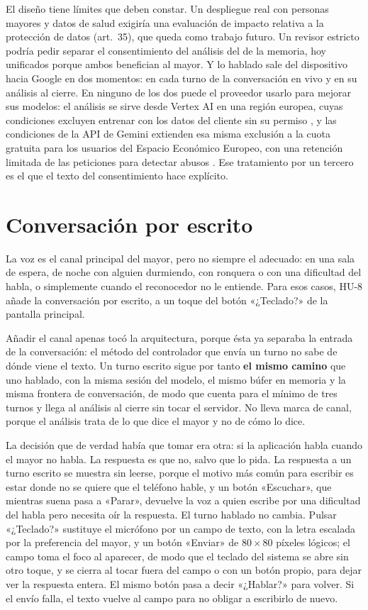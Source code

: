 El diseño tiene límites que deben constar. Un despliegue real con personas mayores y datos de salud exigiría
una evaluación de impacto relativa a la protección de datos (art.~35), que queda como trabajo futuro. Un
revisor estricto podría pedir separar el consentimiento del análisis del de la memoria, hoy unificados porque
ambos benefician al mayor. Y lo hablado sale del dispositivo hacia Google en dos momentos: en cada turno de
la conversación en vivo y en su análisis al cierre. En ninguno de los dos puede el proveedor usarlo para
mejorar sus modelos: el análisis se sirve desde Vertex AI en una región europea, cuyas condiciones excluyen
entrenar con los datos del cliente sin su permiso \citep{VertexDataGovernance}, y las condiciones de la API
de Gemini extienden esa misma exclusión a la cuota gratuita para los usuarios del Espacio Económico Europeo,
con una retención limitada de las peticiones para detectar abusos \citep{GeminiTerms}. Ese tratamiento por
un tercero es el que el texto del consentimiento hace explícito.

\section{Conversación por escrito}
\label{sec:teclado}

La voz es el canal principal del mayor, pero no siempre el adecuado: en una sala de espera, de noche con
alguien durmiendo, con ronquera o con una dificultad del habla, o simplemente cuando el reconocedor no le
entiende. Para esos casos, HU-8 añade la conversación por escrito, a un toque del botón «¿Teclado?» de la
pantalla principal.

Añadir el canal apenas tocó la arquitectura, porque ésta ya separaba la entrada de la conversación: el
método del controlador que envía un turno no sabe de dónde viene el texto. Un turno escrito sigue por tanto
\textbf{el mismo camino} que uno hablado, con la misma sesión del modelo, el mismo búfer en memoria y la
misma frontera de conversación, de modo que cuenta para el mínimo de tres turnos y llega al análisis al
cierre sin tocar el servidor. No lleva marca de canal, porque el análisis trata de lo que dice el mayor y no
de cómo lo dice.

La decisión que de verdad había que tomar era otra: si la aplicación habla cuando el mayor no habla. La
respuesta es que no, salvo que lo pida. La respuesta a un turno escrito se muestra sin leerse, porque el
motivo más común para escribir es estar donde no se quiere que el teléfono hable, y un botón «Escuchar», que
mientras suena pasa a «Parar», devuelve la voz a quien escribe por una dificultad del habla pero necesita oír
la respuesta. El turno hablado no cambia. Pulsar «¿Teclado?» sustituye el micrófono por un campo de texto,
con la letra escalada por la preferencia del mayor, y un botón «Enviar» de $80\times80$ píxeles lógicos; el
campo toma el foco al aparecer, de modo que el teclado del sistema se abre sin otro toque, y se cierra al
tocar fuera del campo o con un botón propio, para dejar ver la respuesta entera. El mismo botón pasa a decir
«¿Hablar?» para volver. Si el envío falla, el texto vuelve al campo para no obligar a escribirlo de nuevo.

